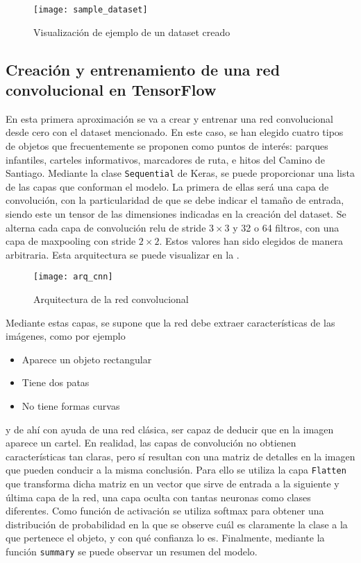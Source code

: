 			\begin{figure}
				\centering
				\texttt{[image: sample\_dataset]}
				\caption{Visualización de ejemplo de un dataset creado}
				\label{fig:sample_dataset}
			\end{figure}
			
		\subsection{Creación y entrenamiento de una red convolucional en TensorFlow}\label{subsec:crear_cnn}
		
			En esta primera aproximación se va a crear y entrenar una red convolucional desde cero con el dataset mencionado. En este caso, se han elegido cuatro tipos de objetos que frecuentemente se proponen como puntos de interés: parques infantiles, carteles informativos, marcadores de ruta, e hitos del Camino de Santiago. Mediante la clase \texttt{Sequential} de Keras, se puede proporcionar una lista de las capas que conforman el modelo. La primera de ellas será una capa de convolución, con la particularidad de que se debe indicar el tamaño de entrada, siendo este un tensor de las dimensiones indicadas en la creación del dataset. Se alterna cada capa de convolución \gls{relu} de stride $3 \times 3$ y 32 o 64 filtros, con una capa de maxpooling con stride $2 \times 2$. Estos valores han sido elegidos de manera arbitraria. Esta arquitectura se puede visualizar en la . \\
			
			\begin{figure}[!h]
				\centering
				\texttt{[image: arq\_cnn]}
				\caption{Arquitectura de la red convolucional}
				\label{fig:arq_cnn}
			\end{figure}
			
			Mediante estas capas, se supone que la red debe extraer características de las imágenes, como por ejemplo
			
			\begin{itemize}
				\item Aparece un objeto rectangular
				\item Tiene dos patas 
				\item No tiene formas curvas
			\end{itemize}
			y de ahí con ayuda de una red clásica, ser capaz de deducir que en la imagen aparece un cartel. En realidad, las capas de convolución no obtienen características tan claras, pero sí resultan con una matriz de detalles en la imagen que pueden conducir a la misma conclusión. Para ello se utiliza la capa \texttt{Flatten} que transforma dicha matriz en un vector que sirve de entrada a la siguiente y última capa de la red, una capa oculta con tantas neuronas como clases diferentes. Como función de activación se utiliza softmax para obtener una distribución de probabilidad en la que se observe cuál es claramente la clase a la que pertenece el objeto, y con qué confianza lo es. Finalmente, mediante la función \texttt{summary} se puede observar un resumen del modelo. 
			
